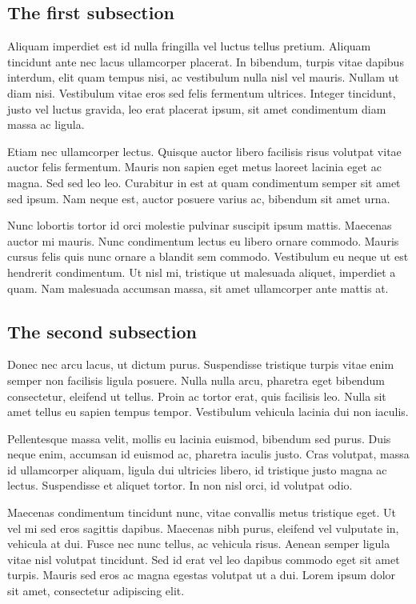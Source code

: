 \subsection{The first subsection}
\label{ch2:second:a}
Aliquam imperdiet est id nulla fringilla vel luctus tellus pretium. Aliquam tincidunt ante nec lacus ullamcorper placerat. In bibendum, turpis vitae dapibus interdum, elit quam tempus nisi, ac vestibulum nulla nisl vel mauris. Nullam ut diam nisi. Vestibulum vitae eros sed felis fermentum ultrices. Integer tincidunt, justo vel luctus gravida, leo erat placerat ipsum, sit amet condimentum diam massa ac ligula. 

Etiam nec ullamcorper lectus. Quisque auctor libero facilisis risus volutpat vitae auctor felis fermentum. Mauris non sapien eget metus laoreet lacinia eget ac magna. Sed sed leo leo. Curabitur in est at quam condimentum semper sit amet sed ipsum. Nam neque est, auctor posuere varius ac, bibendum sit amet urna. 

Nunc lobortis tortor id orci molestie pulvinar suscipit ipsum mattis. Maecenas auctor mi mauris. Nunc condimentum lectus eu libero ornare commodo. Mauris cursus felis quis nunc ornare a blandit sem commodo. Vestibulum eu neque ut est hendrerit condimentum. Ut nisl mi, tristique ut malesuada aliquet, imperdiet a quam. Nam malesuada accumsan massa, sit amet ullamcorper ante mattis at.

\subsection{The second subsection}
\label{ch2:second:b}
Donec nec arcu lacus, ut dictum purus. Suspendisse tristique turpis vitae enim semper non facilisis ligula posuere. Nulla nulla arcu, pharetra eget bibendum consectetur, eleifend ut tellus. Proin ac tortor erat, quis facilisis leo. Nulla sit amet tellus eu sapien tempus tempor. Vestibulum vehicula lacinia dui non iaculis. 

Pellentesque massa velit, mollis eu lacinia euismod, bibendum sed purus. Duis neque enim, accumsan id euismod ac, pharetra iaculis justo. Cras volutpat, massa id ullamcorper aliquam, ligula dui ultricies libero, id tristique justo magna ac lectus. Suspendisse et aliquet tortor. In non nisl orci, id volutpat odio. 

Maecenas condimentum tincidunt nunc, vitae convallis metus tristique eget. Ut vel mi sed eros sagittis dapibus. Maecenas nibh purus, eleifend vel vulputate in, vehicula at dui. Fusce nec nunc tellus, ac vehicula risus. Aenean semper ligula vitae nisl volutpat tincidunt. Sed id erat vel leo dapibus commodo eget sit amet turpis. Mauris sed eros ac magna egestas volutpat ut a dui. Lorem ipsum dolor sit amet, consectetur adipiscing elit.

